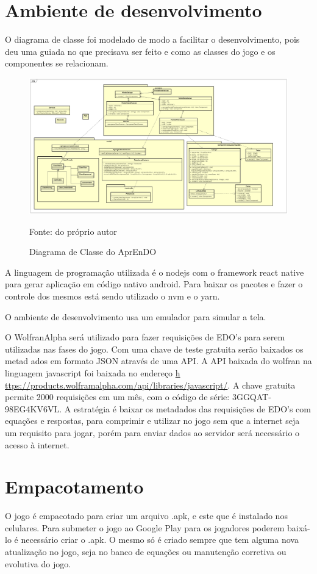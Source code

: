 \section[Ambiente de desenvolvimento]{Ambiente de desenvolvimento}

O diagrama de classe foi modelado de modo a facilitar o desenvolvimento, pois deu uma guiada no que precisava ser feito e como as classes do jogo e os componentes se relacionam. 

\begin{figure}[H]
\centering
\caption{Diagrama de Classe do AprEnDO}
\includegraphics[scale=0.4]{figuras/diagramaClasse0_2.png}

\small{Fonte: do próprio autor}
\end{figure}


A linguagem de programação utilizada é o nodejs com o framework react native para gerar aplicação em código nativo android. Para baixar os pacotes e fazer o controle dos mesmos está sendo utilizado o nvm e o yarn.

O ambiente de desenvolvimento usa um emulador para simular a tela.

O WolfranAlpha será utilizado para fazer requisições de EDO's para serem utilizadas nas fases do jogo. Com uma chave de teste gratuita serão baixados os metad    ados em formato JSON através de uma API.
A API baixada do wolfran na linguagem javascript foi baixada no endereço \url{h    ttps://products.wolframalpha.com/api/libraries/javascript/}.
A chave gratuita permite 2000 requisições em um mês, com o código de série: 3GGQAT-98EG4KV6VL. A estratégia é baixar os metadados das requisições de EDO's com     equações e respostas, para comprimir e utilizar no jogo sem que a internet seja um requisito para jogar, porém para enviar dados ao servidor será necessário o acesso à internet.

\section[Empacotamento]{Empacotamento}
O jogo é empacotado para criar um arquivo .apk, e este que é instalado nos celulares. Para submeter o jogo ao Google Play para os jogadores poderem baixá-lo é necessário criar o .apk. O mesmo só é criado sempre que tem alguma nova atualização no jogo, seja no banco de equações ou manutenção corretiva ou evolutiva do jogo.

